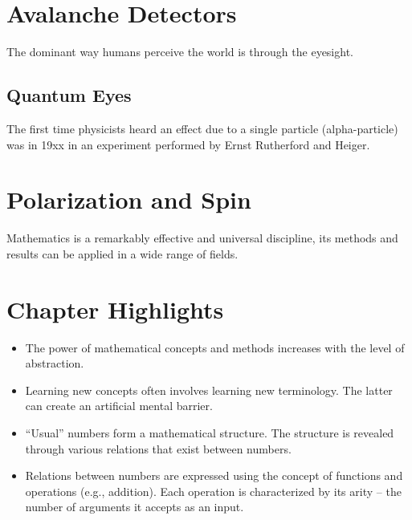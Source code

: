 \section{Avalanche Detectors}
The dominant way humans perceive the world is through the eyesight. 

\subsection{Quantum Eyes}
The first time physicists heard an effect due to a single particle (alpha-particle) was in 19xx in an experiment performed by Ernst Rutherford and Heiger.


\section{Polarization and Spin}
Mathematics is a remarkably effective and universal discipline, its
methods and
results can be applied in a wide range of fields.

\section*{Chapter Highlights}
{\chhc
  \it  
\begin{itemize}
\item The power of mathematical concepts and methods increases with
  the level of abstraction.
\item Learning new concepts often involves learning new
  terminology. The latter can create an artificial mental barrier.
\item ``Usual'' numbers form a mathematical structure. The structure
  is revealed through various relations that exist between numbers.
\item Relations between numbers are expressed using the concept of
  functions and operations (e.g., addition). Each operation is
  characterized by its arity -- the number of arguments it accepts as
  an input.
\end{itemize}


}
